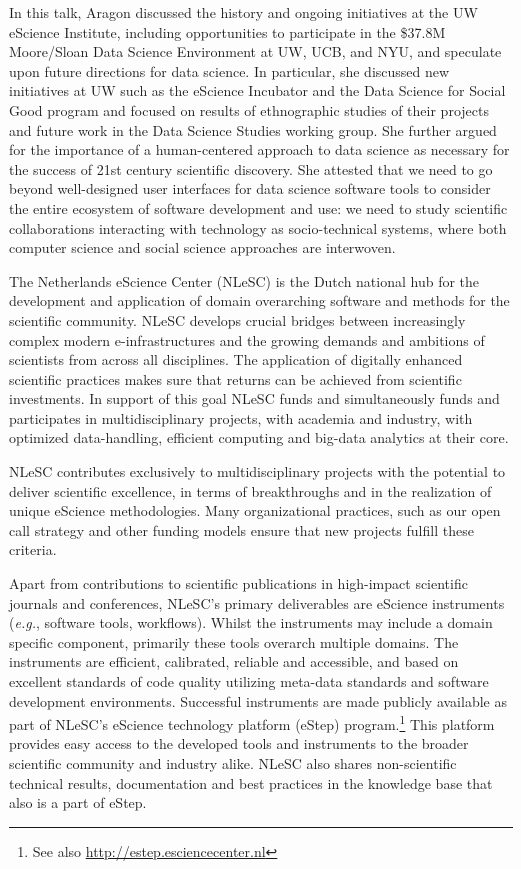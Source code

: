 \documentclass[a4paper,UKenglish]{dagrep}
\newcommand{\eg}{\emph{e.g.},\xspace}
\begin{document}
In this talk, Aragon discussed the history and ongoing initiatives at the UW eScience Institute, including opportunities to participate in the \$37.8M Moore/Sloan Data Science Environment at UW, UCB, and NYU, and speculate upon future directions for data science. In particular, she discussed new initiatives at UW such as the eScience Incubator and the Data Science for Social Good program and focused on results of ethnographic studies of their projects and future work in the Data Science Studies working group. She further argued for the importance of a human-centered approach to data science as necessary for the success of 21st century scientific discovery. She attested that we need to go beyond well-designed user interfaces for data science software tools to consider the entire ecosystem of software development and use: we need to study scientific collaborations interacting with technology as socio-technical systems, where both computer science and social science approaches are interwoven.


The Netherlands eScience Center (NLeSC) is the Dutch national hub for
the development and application of domain overarching software and
methods for the scientific community. NLeSC develops crucial bridges
between increasingly complex modern e-infrastructures and the growing
demands and ambitions of scientists from across all disciplines. The
application of digitally enhanced scientific practices makes sure that
returns can be achieved from scientific investments. In support of this
goal NLeSC funds and simultaneously funds and participates in
multidisciplinary projects, with academia and industry, with optimized
data-handling, efficient computing and big-data analytics at their
core.

NLeSC contributes exclusively to multidisciplinary projects with the
potential to deliver scientific excellence, in terms of breakthroughs
and in the realization of unique eScience methodologies. Many
organizational practices, such as our open call strategy and other
funding models ensure that new projects fulfill these criteria.

Apart from contributions to scientific publications in high-impact
scientific journals and conferences, NLeSC's primary deliverables are
eScience instruments (\eg software tools, workflows). Whilst the
instruments may include a domain specific component, primarily these
tools overarch multiple domains. The instruments are efficient,
calibrated, reliable and accessible, and based on excellent standards
of code quality utilizing meta-data standards and software development
environments. Successful instruments are made publicly available as
part of NLeSC's eScience technology platform (eStep)
program.\footnote{See also \url{http://estep.esciencecenter.nl}}
This platform provides easy access to the developed tools and instruments
to the broader scientific community and industry alike. NLeSC also
shares non-scientific technical results, documentation and best
practices in the knowledge base that also is a part of eStep.
\end{document}
